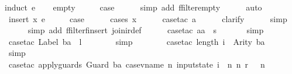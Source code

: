 \begin{isabellebody}
%
\endisadelimproof
%
\isatagproof
{}\isamarkupfalse%
{\isacharparenleft}induct\ e{\isacharparenright}\isanewline
\ \ \isamarkupfalse%
\ empty\isanewline
\ \ \isamarkupfalse%
\ \isamarkupfalse%
\ {\isacharquery}case\isanewline
\ \ \ \ \isamarkupfalse%
\ {\isacharparenleft}simp\ add{\isacharcolon}\ ffilter{\isacharunderscore}empty{\isacharparenright}\isanewline
\ \ \ \ \isamarkupfalse%
\ auto\isanewline
{}\isamarkupfalse%
\isanewline
\ \ \isamarkupfalse%
\ {\isacharparenleft}insert\ x\ e{\isacharparenright}\isanewline
\ \ \isamarkupfalse%
\ \isamarkupfalse%
\ {\isacharquery}case\isanewline
\ \ \ \ \isamarkupfalse%
\ {\isacharparenleft}cases\ x{\isacharparenright}\isanewline
\ \ \ \ \isamarkupfalse%
\ {\isacharparenleft}case{\isacharunderscore}tac\ a{\isacharparenright}\isanewline
\ \ \ \ \isamarkupfalse%
\ clarify\isanewline
\ \ \ \ \isamarkupfalse%
\ simp\isanewline
\ \ \ \ \isamarkupfalse%
\ {\isacharparenleft}simp\ add{\isacharcolon}\ ffilter{\isacharunderscore}finsert\ join{\isacharunderscore}ir{\isacharunderscore}def{\isacharparenright}\isanewline
\ \ \ \ \isamarkupfalse%
\ {\isacharparenleft}case{\isacharunderscore}tac\ {\isachardoublequoteopen}aa\ {\isacharequal}\ s{\isachardoublequoteclose}{\isacharparenright}\isanewline
\ \ \ \ \ \isamarkupfalse%
\ simp\isanewline
\ \ \ \ \ \isamarkupfalse%
\ {\isacharparenleft}case{\isacharunderscore}tac\ {\isachardoublequoteopen}Label\ ba\ {\isacharequal}\ l{\isachardoublequoteclose}{\isacharparenright}\isanewline
\ \ \ \ \ \ \isamarkupfalse%
\ simp\isanewline
\ \ \ \ \ \ \isamarkupfalse%
\ {\isacharparenleft}case{\isacharunderscore}tac\ {\isachardoublequoteopen}length\ i\ {\isacharequal}\ Arity\ ba{\isachardoublequoteclose}{\isacharparenright}\isanewline
\ \ \ \ \ \ \ \isamarkupfalse%
\ simp\isanewline
\ \ \ \ \ \ \ \isamarkupfalse%
\ {\isacharparenleft}case{\isacharunderscore}tac\ {\isachardoublequoteopen}apply{\isacharunderscore}guards\ {\isacharparenleft}Guard\ ba{\isacharparenright}\ {\isacharparenleft}case{\isacharunderscore}vname\ {\isacharparenleft}{\isasymlambda}n{\isachardot}\ input{}state\ i\ {\isachardollar}\ n{\isacharparenright}\ {\isacharparenleft}{\isasymlambda}n{\isachardot}\ r\ {\isachardollar}\ \ n{\isacharparenright}{\isacharparenright}{\isachardoublequoteclose}{\isacharparenright}\isanewline

\end{isabellebody}
